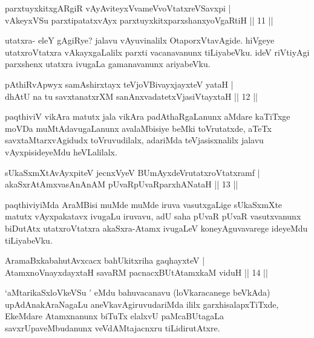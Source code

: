 \begin{shl}
parxtuyxkitxgARgiR vAyAviteyxVvameVvoVtatxreVSavxpi |\\
vAkeyxVSu parxtipatatxvAyx parxtuyxkitxparxshanxyoVgaRtiH \hfill || 11 ||
\end{shl}

\begin{artha}
utatxra- eleY gAgiRye? jalavu vAyuvinalilx OtaporxVtavAgide. hiVgeye utatxroVtatxra vAkayxgaLalilx parxti vacanavanunx tiLiyabeVku. ideV riVtiyAgi parxshenx utatxra ivugaLa gamanavanunx ariyabeVku.
\end{artha}


\begin{shl}
pAthiRvApwyx samAshirxtayx teVjoV\s BivayxjayxteV yataH |\\
dhAtU na tu savxtanatxrXM sanAnxvadatetxVjasiVtayxtaH \hfill || 12 ||
\end{shl}

\begin{artha}
paqthiviV vikAra matutx jala vikAra padAthaRgaLanunx aMdare kaTiTxge moVDa muMtAdavugaLanunx avalaMbisiye beMki toVrutatxde, aTeTx savxtaMtarxvAgidudx toVruvudilalx, adariMda teVjasisxnalilx jalavu vAyxpisideyeMdu heVLalilalx.
\end{artha}

\begin{shl}
sUkaSxmXtAvAyxpiteV jecnxVyeV BUmAyxdeVrutatxroVtatxramf |\\
akaSxrAtAmxvasAnAnAM pUvaRpUvaRparxhANataH \hfill || 13 ||
\end{shl}

\begin{artha}%
paqthiviyiMda AraMBisi muMde muMde iruva vasutxgaLige sUkaSxmXte matutx vAyxpakatavx ivugaLu iruvavu, adU saha pUvaR pUvaR vasutxvanunx biDutAtx utatxroVtatxra akaSxra-Atamx ivugaLeV koneyAguvavarege ideyeMdu tiLiyabeVku.
\end{artha}

\begin{shl}
AramaBxkabahutAvxcacx bahUkitxriha gaqhayxteV |\\
AtamxnoV\s nayxdayxtaH savaRM pacnacxBUtAtamxkaM viduH \hfill || 14 ||
\end{shl}

\begin{artha}
`aMtarikaSxloVkeVSu ' eMdu bahuvacanavu (loVkaracanege beVkAda) upAdAnakAraNagaLu aneVkavAgiruvudariMda ililx garxhisalapxTiTxde, EkeMdare Atamxnanunx biTuTx elalxvU paMcaBUtagaLa savxrUpaveMbudanunx veVdAMtajacnxru tiLidirutAtxre.
\end{artha}

